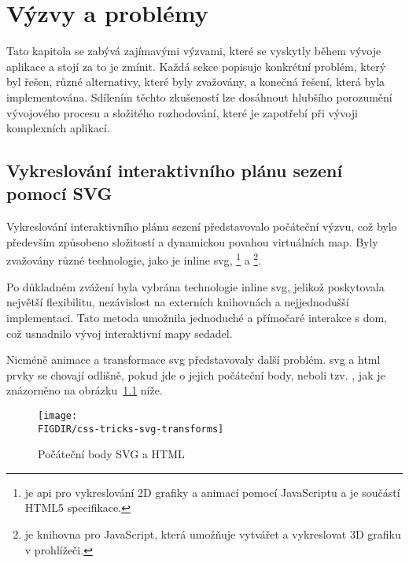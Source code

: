 \chapter{Výzvy a problémy}
\label{ch:vyzvy-a-problemy}
Tato kapitola se zabývá zajímavými výzvami, které se vyskytly během vývoje aplikace a stojí za to je zmínit.
Každá sekce popisuje konkrétní problém, který byl řešen, různé alternativy, které byly zvažovány, a konečná řešení, která byla implementována.
Sdílením těchto zkušeností lze dosáhnout hlubšího porozumění vývojového procesu a složitého rozhodování, které je zapotřebí při vývoji komplexních aplikací.

\section{Vykreslování interaktivního plánu sezení pomocí SVG}
\label{sec:vyzvy-a-problemy-rendering-sedadel}
Vykreslování interaktivního plánu sezení představovalo počáteční výzvu, což bylo především způsobeno složitostí a dynamickou povahou virtuálních map.
Byly zvažovány různé technologie, jako je inline \ac{svg}, \footnote{ je \ac{api} pro vykreslování 2D grafiky a animací pomocí JavaScriptu a je součástí HTML5 specifikace\cite{mdn_api_canvas_api}.} a \footnote{ je knihovna pro JavaScript, která umožňuje vytvářet a vykreslovat 3D grafiku v prohlížeči\cite{mdn_games_techniques_3d_on_the_web_building_up_a_basic_demo_with_three_js}.}.

Po důkladném zvážení byla vybrána technologie inline \ac{svg}, jelikož poskytovala největší flexibilitu, nezávislost na externích knihovnách a nejjednodušší implementaci\cite{s_blog_seating_plan_rendering}.
Tato metoda umožnila jednoduché a přímočaré interakce s \ac{dom}, což usnadnilo vývoj interaktivní mapy sedadel.

Nicméně animace a transformace \ac{svg} představovaly další problém.
\ac{svg} a \ac{html} prvky se chovají odlišně, pokud jde o jejich počáteční body, neboli tzv. , jak je znázorněno na obrázku~\ref{fig:css-tricks-svg-transforms} níže.

\begin{figure}[H]
    \centering
    \texttt{[image: \\FIGDIR/css-tricks-svg-transforms]}
    \caption{Počáteční body SVG a HTML\cite{ct_css_tricks_com_transforms_on_svg_elements}}
    \label{fig:css-tricks-svg-transforms}
\end{figure}

